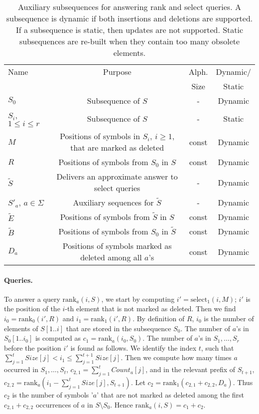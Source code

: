 \documentclass[11pt]{article}\usepackage{fullpage}
\def\idrm#1{\ensuremath{\mathrm{#1}}}
\newcommand{\no}[1]{}
\newcommand{\tS}{{\tilde S}}
\newcommand{\tB}{{\tilde B}}
\newcommand{\tE}{{\tilde E}}
\newcommand{\ra}{\idrm{rank}}
\newcommand{\sel}{\idrm{select}}
\begin{document}
\begin{table}[tb]
  \centering
  \begin{tabular}{|l|c|c|c|} \hline
    Name & Purpose & Alph. & Dynamic/ \\
         &          & Size  & Static\\ \hline
    $S_0$                & Subsequence of $S$ & - & Dynamic \\
    $S_i$, $1\le i\le r$ & Subsequence of $S$ & - & Static \\
$M$       & Positions of symbols in $S_i$, $i\ge 1$, that are marked as deleted & const & Dynamic \\
    $R$                  & Positions of symbols from $S_0$ in $S$ \no{Relative order of symbols in $S_0$ and $S_i$ for $i\ge 1$} & const & Dynamic\\
$\tS$                & Delivers an approximate answer to select queries          & -  & Dynamic \\
    $S'_a$, $a\in \Sigma$ & Auxiliary sequences for $\tS$                            & - & Dynamic \\
    $\tE$                & Positions of symbols from $\tS$ in $S$                    & const & Dynamic \\
    $\tB$                & Positions of symbols from $S_0$ in $\tS$  & const & Dynamic \\
    $D_a$                & Positions of symbols marked as deleted among all $a$'s    & const & Dynamic \\
\hline
  \end{tabular}
  \caption{Auxiliary subsequences for answering rank and select queries. A subsequence is dynamic if both insertions and deletions are supported. If a subsequence is static, then updates are not supported. Static subsequences are re-built when they contain too many obsolete elements.}
  \label{tab:auxdata}
\end{table}


\paragraph{Queries.}
To answer a query $\ra_a(i,S)$, we start by computing $i'=\sel_1(i,M)$; $i'$ is the position of the $i$-th element that is not marked as deleted. Then we find $i_0=\ra_0(i',R)$ and $i_1=\ra_1(i',R)$. By definition of $R$, $i_0$ is the number of elements of $S[1..i]$ that are stored in the subsequence $S_0$. 
The number of $a$'s in $S_0[1..i_0]$  is computed as $c_1=\ra_a(i_0,S_0)$.
The number of $a$'s in $S_1,\ldots, S_r$ before the position $i'$ is 
found as follows. We identify the index $t$, such that $\sum_{j=1}^t Size[j]<i_1\le \sum_{j=1}^{t+1}Size[j]$. 
Then we compute how many times $a$ occurred in $S_1,\ldots ,S_t$, $c_{2,1}=\sum_{j=1}^{t}Count_a[j]$, 
and in the relevant prefix of $S_{t+1}$, $c_{2,2}=\ra_a(i_1-\sum_{j=1}^{t}Size[j],S_{t+1})$. 
Let $c_2=\ra_1(c_{2,1}+c_{2,2},D_a)$. Thus $c_2$ is the number of symbols '$a$' that are not marked as deleted among the first $c_{2,1}+c_{2,2}$ occurrences of $a$ in $S\setminus S_0$.
Hence $\ra_a(i,S)=c_1+c_2$.
\end{document}
